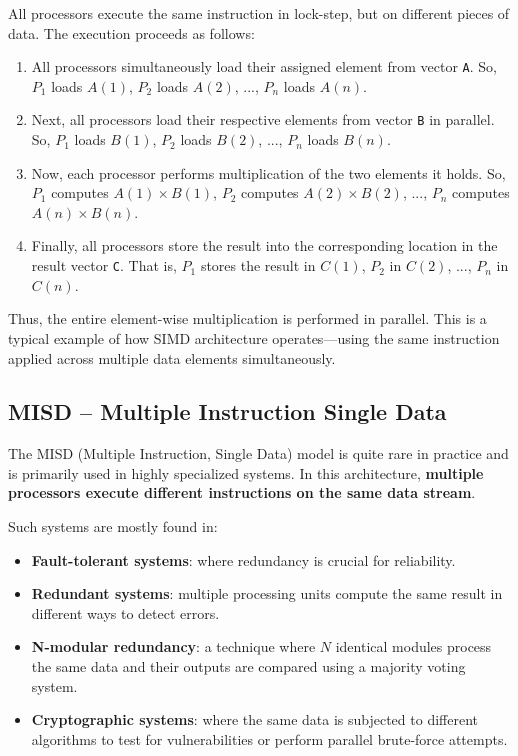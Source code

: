 \documentclass[12pt]{book}
\begin{document}
All processors execute the same instruction in lock-step, but on different pieces of data. The execution proceeds as follows:

\begin{enumerate}
    \item All processors simultaneously load their assigned element from vector \texttt{A}. So, $P_1$ loads $A(1)$, $P_2$ loads $A(2)$, ..., $P_n$ loads $A(n)$.
    
    \item Next, all processors load their respective elements from vector \texttt{B} in parallel. So, $P_1$ loads $B(1)$, $P_2$ loads $B(2)$, ..., $P_n$ loads $B(n)$.
    
    \item Now, each processor performs multiplication of the two elements it holds. So, $P_1$ computes $A(1) \times B(1)$, $P_2$ computes $A(2) \times B(2)$, ..., $P_n$ computes $A(n) \times B(n)$.
    
    \item Finally, all processors store the result into the corresponding location in the result vector \texttt{C}. That is, $P_1$ stores the result in $C(1)$, $P_2$ in $C(2)$, ..., $P_n$ in $C(n)$.
\end{enumerate}

Thus, the entire element-wise multiplication is performed in parallel. This is a typical example of how SIMD architecture operates—using the same instruction applied across multiple data elements simultaneously.

\subsection{MISD – Multiple Instruction Single Data}

The MISD (Multiple Instruction, Single Data) model is quite rare in practice and is primarily used in highly specialized systems. In this architecture, \textbf{multiple processors execute different instructions on the same data stream}.

Such systems are mostly found in:
\begin{itemize}
    \item \textbf{Fault-tolerant systems}: where redundancy is crucial for reliability.
    \item \textbf{Redundant systems}: multiple processing units compute the same result in different ways to detect errors.
    \item \textbf{N-modular redundancy}: a technique where $N$ identical modules process the same data and their outputs are compared using a majority voting system.
    \item \textbf{Cryptographic systems}: where the same data is subjected to different algorithms to test for vulnerabilities or perform parallel brute-force attempts.
\end{itemize}
\end{document}
